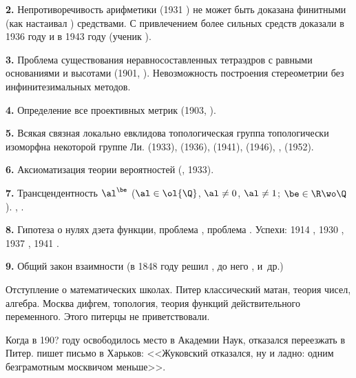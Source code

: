 \documentclass[a4paper,oneside,fleqn,10pt]{article}
\begin{document}
\medskip

\textbf{2.} Непротиворечивость арифметики (1931 )
не может быть доказана финитными (как настаивал )
средствами. С привлечением более сильных средств доказали
в 1936 году  и в 1943 году 
(ученик ).

\medskip

\textbf{3.} Проблема существования неравносоставленных тетраэдров
с равными основаниями и высотами (1901, ).
Невозможность построения стереометрии без инфинитезимальных методов.

\medskip

\textbf{4.} Определение все проективных метрик (1903, ).

\medskip

\textbf{5.} Всякая связная локально евклидова топологическая группа топологически
изоморфна некоторой группе Ли.  (1933),
 (1936),  (1941),  (1946),
,  (1952).

\medskip

\textbf{6.} Аксиоматизация теории вероятностей (, 1933).

\medskip

\textbf{7.} Трансцендентность $\al^\be$ ($\al \in \ol{\Q}$, $\al \ne 0$, $\al \ne 1$; $\be \in \R\wo\Q$).
, .

\medskip

\textbf{8.} Гипотеза  о нулях дзета функции, проблема , проблема
.
Успехи: 1914 , 1930 , 1937 , 1941 .

\medskip

\textbf{9.} Общий закон взаимности (в 1848 году решил ,
до него ,  и~др.)

\medskip

Отступление о математических школах. Питер классический матан, теория чисел, алгебра.
Москва дифгем, топология, теория функций действительного переменного.
Этого питерцы не приветствовали.

Когда в 190? году освободилось место в Академии Наук,  отказался переезжать в Питер.
 пишет письмо  в Харьков:
<<Жуковский отказался, ну и ладно: одним безграмотным москвичом меньше>>.
\end{document}
